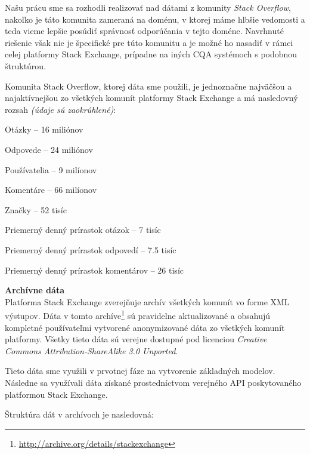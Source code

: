 Našu prácu sme sa rozhodli realizovať nad dátami z komunity \textit{Stack Overflow},
nakoľko je táto komunita zameraná na doménu, v ktorej máme hlbšie vedomosti a teda vieme lepšie posúdiť správnosť
odporúčania v tejto doméne. Navrhnuté riešenie však nie je špecifické pre túto komunitu a je možné ho nasadiť v rámci
celej platformy Stack Exchange, prípadne na iných CQA systémoch s podobnou štruktúrou.

Komunita Stack Overflow, ktorej dáta sme použili, je jednoznačne najväčšou a najaktívnejšou zo všetkých komunít
platformy Stack Exchange a má nasledovný rozsah \emph{(údaje sú zaokrúhlené)}:

\begin{my_itemize}
    \item{Otázky -- 16 miliónov}
    \item{Odpovede -- 24 miliónov}
    \item{Používatelia -- 9 milíonov}
    \item{Komentáre -- 66 milíonov}
    \item{Značky -- 52 tisíc}
    \item{Priemerný denný prírastok otázok -- 7 tisíc}
    \item{Priemerný denný prírastok odpovedí -- 7.5 tisíc}
    \item{Priemerný denný prírastok komentárov -- 26 tisíc}
\end{my_itemize}

\textbf{Archívne dáta}\\
Platforma Stack Exchange zverejňuje archív všetkých komunít vo forme XML výstupov. Dáta v tomto
archíve\footnote{\url{http://archive.org/details/stackexchange}} sú pravidelne aktualizované a obsahujú kompletné
používateľmi vytvorené anonymizované dáta zo všetkých komunít platformy. Všetky tieto dáta sú verejne dostupné pod
licenciou \emph{Creative Commons Attribution-ShareAlike 3.0 Unported}.

Tieto dáta sme využili v prvotnej fáze na vytvorenie základných modelov. Následne sa využívali dáta získané
prostedníctvom verejného API poskytovaného platformou Stack Exchange.

Štruktúra dát v archívoch je nasledovná:

